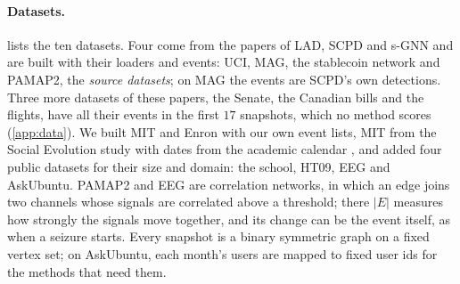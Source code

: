\documentclass[11pt]{article}
\theoremstyle{dsplain}
\theoremstyle{definition}
\begin{document}
\paragraph{Datasets.}  lists the ten datasets. Four come from the papers of LAD, SCPD and s-GNN
and are built with their loaders and events: UCI, MAG, the stablecoin network and PAMAP2, the
\emph{source datasets}; on MAG the events are SCPD's own detections. Three more datasets of these papers, the
Senate, the Canadian bills and the flights, have all their events in the first $17$ snapshots, which no
method scores (\cref{app:data}). We built MIT and Enron with our own event lists, MIT from the
Social Evolution study with dates from the academic calendar \citep{mit2008calendar}, and added four public
datasets for their size and domain: the school, HT09, EEG and AskUbuntu. PAMAP2 and
EEG are correlation networks, in which an edge joins two channels whose signals are correlated above a
threshold; there $|E|$ measures how strongly the signals move together, and its change can be the event
itself, as when a seizure starts. Every snapshot is a binary symmetric graph on a fixed vertex set; on AskUbuntu, 
each month's users are mapped to fixed user ids for the methods that need them.
\end{document}
